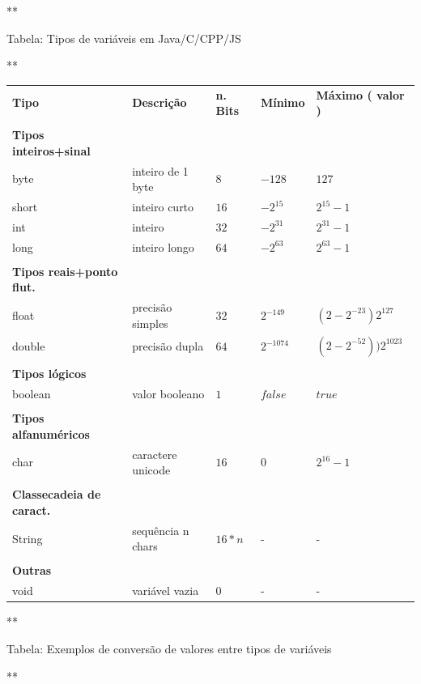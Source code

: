 \documentclass[12pt,a4paper]{article}
\begin{document}
    **

Tabela: Tipos de variáveis em Java/C/CPP/JS

**

\begin{longtable}[]{@{}lllll@{}}
\toprule
\endhead
\textbf{Tipo} & \textbf{Descrição} & \textbf{n. Bits} & \textbf{Mínimo}
& \textbf{Máximo ( valor )}\tabularnewline
& & & &\tabularnewline
\textbf{Tipos inteiros+sinal} & & & &\tabularnewline
byte & inteiro de 1 byte & \(8\) & \(-128\) & \(127\)\tabularnewline
short & inteiro curto & \(16\) & \(-2^{15}\) &
\(2^{15}-1\)\tabularnewline
int & inteiro & \(32\) & \(-2^{31}\) & \(2^{31}-1\)\tabularnewline
long & inteiro longo & \(64\) & \(-2^{63}\) &
\(2^{63}-1\)\tabularnewline
& & & &\tabularnewline
\textbf{Tipos reais+ponto flut.} & & & &\tabularnewline
float & precisão simples & \(32\) & \(2^{-149}\) &
\((2-2^{-23})2^{127}\)\tabularnewline
double & precisão dupla & \(64\) & \(2^{-1074}\) &
\((2-2^{-52}))2^{1023}\)\tabularnewline
& & & &\tabularnewline
\textbf{Tipos lógicos} & & & &\tabularnewline
boolean & valor booleano & \(1\) & \(false\) & \(true\)\tabularnewline
& & & &\tabularnewline
\textbf{Tipos alfanuméricos} & & & &\tabularnewline
char & caractere unicode & \(16\) & \(0\) & \(2^{16}-1\)\tabularnewline
& & & &\tabularnewline
\textbf{Classecadeia de caract.} & & & &\tabularnewline
String & sequência n chars & \(16*n\) & - & -\tabularnewline
& & & &\tabularnewline
\textbf{Outras} & & & &\tabularnewline
void & variável vazia & \(0\) & - & -\tabularnewline
\bottomrule
\end{longtable}

    **

Tabela: Exemplos de conversão de valores entre tipos de variáveis

**
\end{document}
